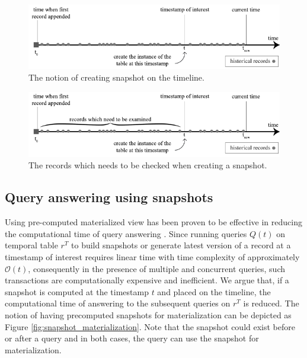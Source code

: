 		\begin{figure}
			\centering
			\includegraphics[width=\textwidth]{figs/snapshot_notion.pdf}
			\caption{The notion of creating snapshot on the timeline.}
			\label{fig:snapshot_notion}
		\end{figure}

		\begin{figure}
			\centering
			\includegraphics[width=\textwidth]{figs/tobechecked_records.pdf}
			\caption{The records which needs to be checked when creating a snapshot.}
			\label{fig:checked_records}
		\end{figure}

		

		\subsection{Query answering using snapshots} \label{sec:query_using_snapshots}
			Using pre-computed materialized view has been proven to be effective in reducing the computational time of query answering \cite{sohrabi2016materialized} \cite{du2017deepsea}. Since running queries $Q(t)$ on temporal table $r^T$ to build snapshots or generate latest version of a record at a timestamp of interest requires linear time with time complexity of approximately $\mathcal{O}(t)$, consequently in the presence of multiple and concurrent queries, such transactions are computationally expensive and inefficient. We argue that, if a snapshot is computed at the timestamp $t$ and placed on the timeline, the computational time of answering to the subsequent queries on $r^T$ is reduced. The notion of having precomputed snapshots for materialization can be depicted as Figure \ref{fig:snapshot_materialization}. Note that the snapshot could exist before or after a query and in both cases, the query can use the snapshot for materialization.

